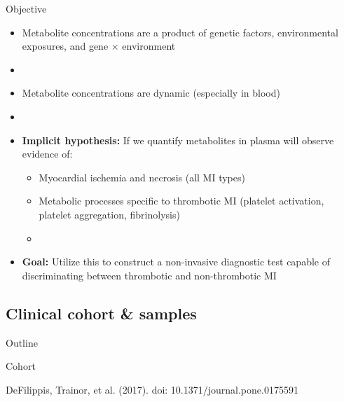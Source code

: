 \documentclass[xcolor=dvipsnames]{beamer}
\begin{document}
\begin{frame}{Objective}
	\vspace{-10pt}
	\begin{itemize}
		\item Metabolite concentrations are a product of genetic factors, environmental exposures, and gene $\times$ environment 
		\item[]
		\item Metabolite concentrations are dynamic (especially in blood)
		\item[]
		\item \textbf{Implicit hypothesis:} If we quantify metabolites in plasma will observe evidence of:
		\begin{itemize}
			\item Myocardial ischemia and necrosis (all MI types)
			\item Metabolic processes specific to thrombotic MI (platelet activation, platelet aggregation, fibrinolysis)
			\item[]
		\end{itemize}
		\item \textbf{Goal:} Utilize this to construct a non-invasive diagnostic test capable of discriminating between thrombotic and non-thrombotic MI
	\end{itemize}
\end{frame}

\subsection{Clinical cohort \& samples}
\begin{frame}{Outline}
	\vspace{-10.5pt}
	\tableofcontents[currentsection,subsectionstyle=show/shaded/hide]
\end{frame}

\begin{frame}{Cohort}
	\vspace{-10pt}
	\begin{center}
		
		DeFilippis, Trainor, et al. (2017). doi: 10.1371/journal.pone.0175591
	\end{center}
\end{frame}
\end{document}
